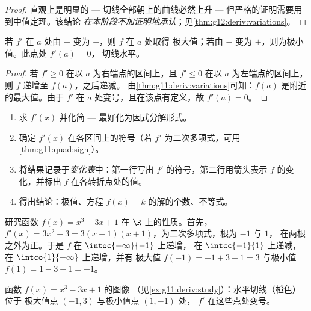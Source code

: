 \begin{proof}
直观上是明显的 --- 切线全部朝上的曲线必然上升 ---
但严格的证明需要用到中值定理。该结论
\emph{在本阶段不加证明地承认}；见\cref{thm:g12:deriv:variations}。
\end{proof}

\begin{proposition}[极值]\label{prop:g11:deriv:extrema}
若 $f'$ 在 $a$ 处由 $+$ 变为 $-$，则 $f$ 在 $a$ 处取得
极大值；若由 $-$ 变为 $+$，则为极小值。此点处 $f'(a) = 0$，
切线水平。
\end{proposition}

\begin{proof}
若 $f' \geq 0$ 在以 $a$ 为右端点的区间上，且 $f' \leq 0$
在以 $a$ 为左端点的区间上，则 $f$ 递增至 $f(a)$，之后递减。
由\cref{thm:g11:deriv:variations}可知：$f(a)$ 是附近的最大值。由于 $f'$
在 $a$ 处变号，且在该点有定义，故 $f'(a) = 0$。
\end{proof}

\begin{method}[研究函数]\label{met:g11:deriv:study}
\begin{enumerate}
  \item 求 $f'(x)$ 并化简 --- 最好化为因式分解形式。
  \item 确定 $f'(x)$ 在各区间上的符号（若
        $f'$ 为二次多项式，可用\cref{thm:g11:quad:sign}）。
  \item 将结果记录于\emph{变化表}中：第一行写出
        $f'$ 的符号，第二行用箭头表示 $f$ 的变化，并标出
        $f$ 在各转折点处的值。
  \item 得出结论：极值、方程 $f(x) = k$ 的解的个数、不等式。
\end{enumerate}
\end{method}

\begin{example}\label{ex:g11:deriv:study}
研究函数 $f(x) = x^3 - 3x + 1$ 在 $\R$ 上的性质。首先，
$f'(x) = 3x^2 - 3 = 3(x-1)(x+1)$，为二次多项式，根为 $-1$ 与 $1$，
在两根之外为正。于是 $f$ 在 $\intoc{-\infty}{-1}$ 上递增，
在 $\intcc{-1}{1}$ 上递减，在 $\intco{1}{+\infty}$ 上递增，并有
极大值 $f(-1) = -1 + 3 + 1 = 3$ 与极小值
$f(1) = 1 - 3 + 1 = -1$。
\end{example}

\begin{omfigure}

{\small 函数 $f(x) = x^3 - 3x + 1$ 的图像
（见\cref{ex:g11:deriv:study}）：水平切线（橙色）位于
极大值点 $(-1, 3)$ 与极小值点 $(1, -1)$ 处，
$f'$ 在这些点处变号。}
\end{omfigure}


